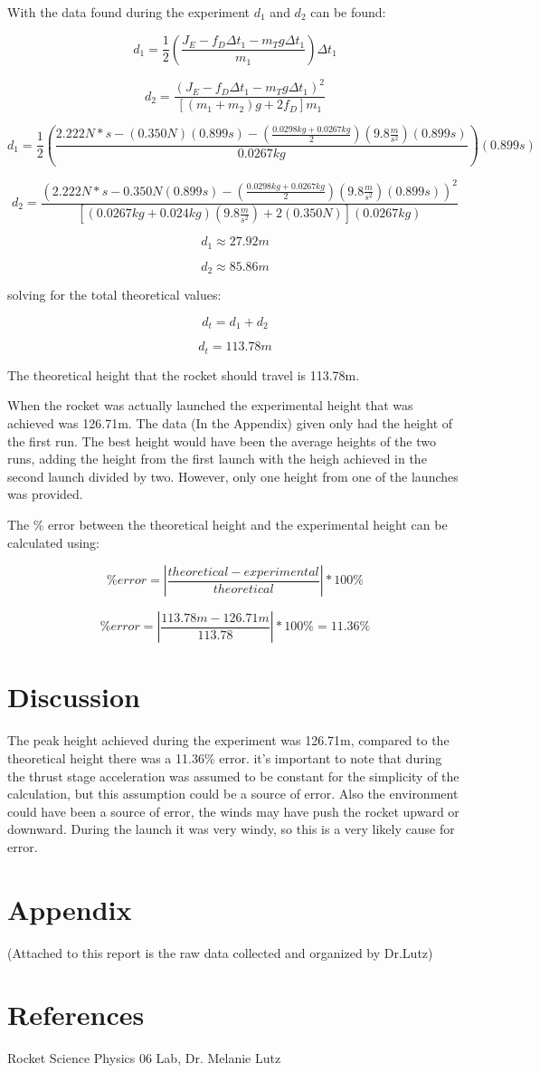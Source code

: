 \documentclass[aps,letterpaper,11pt]{revtex4}
\begin{document}
With the data found during the experiment $d_1$ and $d_2$ can be found:

$$ d_1 = \frac{1}{2}(\frac{J_E - f_D\Delta t_1 - m_Tg\Delta t_1}{m_1})\Delta t_1$$

$$ d_2 = \frac{(J_E-f_D\Delta t_1-m_Tg\Delta t_1)^2}{[(m_1+m_2)g+2f_D]m_1}$$

$$d_1 = \frac{1}{2}(\frac{2.222N*s - (0.350N)(0.899s) - (\frac{0.0298kg+0.0267kg}{2})(9.8\frac{m}{s^2})(0.899s)}{0.0267kg})(0.899s) $$

$$ d_2 = \frac{(2.222N*s-0.350N(0.899s)-(\frac{0.0298kg + 0.0267kg}{2})(9.8\frac{m}{s^2})(0.899s))^2}{[(0.0267kg+0.024kg)(9.8\frac{m}{s^2})+2(0.350N)](0.0267kg)}$$

$$ d_1 \approx 27.92m$$

$$ d_2 \approx 85.86m$$

solving for the total theoretical values: 

$$ d_t = d_1 +d_2$$

$$ d_t = 113.78m$$

The theoretical height that the rocket should travel is 113.78m.

When the rocket was actually launched the experimental height that was achieved was 126.71m. The data (In the Appendix) given only had the height of the first run. The best height would have been the average heights of the two runs, adding the height from the first launch with the heigh achieved in the second launch divided by two. However, only one height from one of the launches was provided. 

The \% error between the theoretical height and the experimental height can be calculated using: 

$$ \% error = |\frac{theoretical-experimental}{theoretical}|*100\%$$

$$ \% error = |\frac{113.78m - 126.71m}{113.78}|*100\% = \boxed{11.36\%}$$

\section{Discussion} 

The peak height achieved during the experiment was 126.71m, compared to the theoretical height there was a 11.36\% error. it's important to note that during the thrust stage acceleration was assumed to be constant for the simplicity of the calculation, but this assumption could be a source of error. Also the environment could have been a source of error, the winds may have push the rocket upward or downward. During the launch it was very windy, so this is a very likely cause for error.

\section{Appendix}

(Attached to this report is the raw data collected and organized by Dr.Lutz)

\section{References}

\hspace{-6.5mm}
Rocket Science Physics 06 Lab, Dr. Melanie Lutz\\
\end{document}

